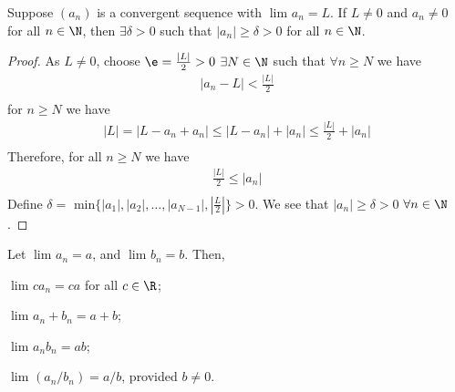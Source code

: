 \begin{theorem}
        Suppose $\left( a_n \right) $ is a convergent sequence with $\lim_{} a_n = L$. If $L\neq 0$ and $a_n\neq 0$ for all $n \in \N$, then $\exists \delta > 0$ such that $\left|a_n\right| \ge \delta > 0$ for all $n \in \N$.
\end{theorem}

\begin{proof}
        As $L \neq 0$, choose $\e = \frac{\left|L\right|}{2} > 0$ $\exists N \in \N$ such that $\forall n \ge N$ we have
        \begin{align}
                \left|a_n - L\right| < \frac{\left|L\right|}{2}\\
        \end{align}
        for $n \ge N$ we have
        \begin{align}
                \left|L\right| = \left|L - a_n + a_n \right|\le \left|L - a_n\right| + \left|a_n\right| \le \frac{\left|L\right|}{2} + \left|a_n\right|\\
        \end{align}
        Therefore, for all $n \ge N$ we have
        \begin{align}
                \frac{\left|L\right|}{2} \le \left|a_n\right| \\
        \end{align}
Define $\delta = \text{ min}\{\left|a_1\right|, \left|a_2\right|, \ldots, \left|a_{N-1}\right|, \left|\frac{L}{2}\right|\} > 0$. We see that  $\left|a_n\right| \ge \delta > 0$ $\forall n \in \N$.
\end{proof}


\begin{theorem}
	Let $\lim_{} a_n = a$, and $\lim_{} b_n =b$. Then,
	\begin{alphabetize}
		\item $\lim_{} ca_n = ca$ for all $c \in \R$;
		\item $\lim_{} a_n + b_n = a + b$;
		\item $\lim_{} a_n b_n = ab$;
		\item $\lim_{} \left( a_n / b_n \right) = a / b$, provided $b \neq 0$.
	\end{alphabetize}
\end{theorem}

